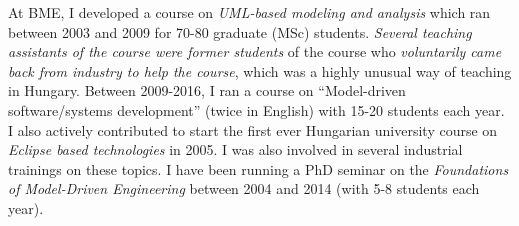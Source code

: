 \documentclass[a4paper,11pt]{article}
\begin{document}
At BME, I developed a course on \emph{UML-based modeling and analysis} which ran between 2003 and 2009 for 70-80 graduate (MSc) students. \emph{Several teaching assistants of the course were former students} of the course who \emph{voluntarily came back from industry to help the course}, which was a highly unusual way of teaching in Hungary. Between 2009-2016, I ran a course on “Model-driven software/systems development” (twice in English) with 15-20 students each year. I also actively contributed to start the first ever Hungarian university course on \emph{Eclipse based technologies} in 2005. I was also involved in several industrial trainings on these topics. I have been running a PhD seminar on the \emph{Foundations of Model-Driven Engineering} between 2004 and 2014 (with 5-8 students each year). 



\end{document}
